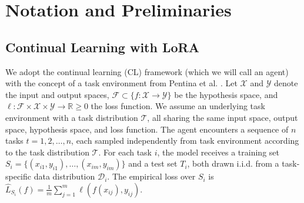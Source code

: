 \documentclass[letterpaper]{article} %
\begin{document}
\section{Notation and Preliminaries}

\subsection{Continual Learning with LoRA}


We adopt the continual learning (CL) framework (which we will call an agent) with the concept of a task environment from Pentina et al. . Let $\mathcal{X}$ and $\mathcal{Y}$ denote the input and output spaces, $\mathcal{F} \subset \{f : \mathcal{X} \to \mathcal{Y}\}$ be the hypothesis space, and $\ell: \mathcal{F} \times \mathcal{X} \times \mathcal{Y} \to \mathbb{R}{\geq 0}$ the loss function. We assume an underlying task environment with a task distribution $\mathcal{T}$, all sharing the same input space, output space, hypothesis space, and loss function. The agent encounters a sequence of $n$ tasks ${t=1, 2, \ldots, n}$, each sampled independently from task environment according to the task distribution $\mathcal{T}$. For each task $i$, the model receives a training set $S_i = \{(x_{i1}, y_{i1}), \ldots, (x_{im}, y_{im})\}$ and a test set $T_i$, both drawn i.i.d. from a task-specific data distribution $\mathcal{D}_i$. The empirical loss over
$S_i$ is $\hat{L}_{S_i}(f) = \frac{1}{m}\sum_{j=1}^{m} \ell(f(x_{ij}), y_{ij})$.
\end{document}
